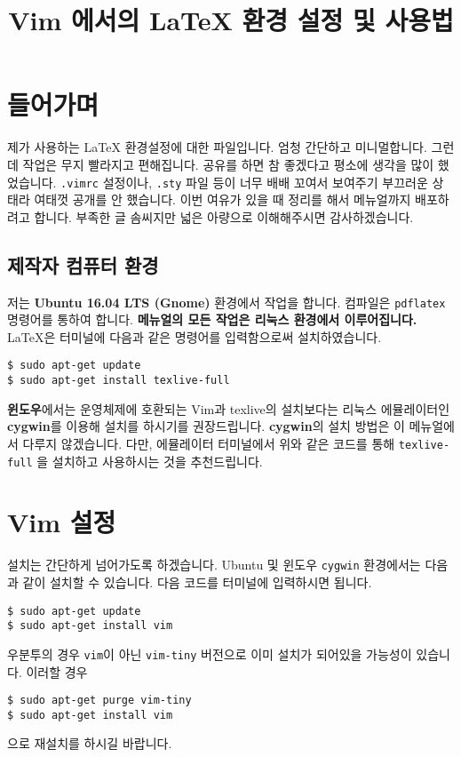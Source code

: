\documentclass[a4paper,10pt]{article}
\title{Vim 에서의 LaTeX 환경 설정 및 사용법}
\author{}
\date{}
\begin{document}
\maketitle

\section{들어가며}
제가 사용하는 LaTeX 환경설정에 대한 파일입니다. 엄청 간단하고 미니멀합니다.
그런데 작업은 무지 빨라지고 편해집니다. 공유를 하면 참 좋겠다고 평소에 생각을 많이
했었습니다. \texttt{.vimrc} 설정이나, \texttt{.sty} 파일 등이 너무 배배 꼬여서 보여주기
부끄러운 상태라 여태껏 공개를 안 했습니다. 이번 여유가 있을 때 정리를 해서 메뉴얼까지
배포하려고 합니다. 부족한 글 솜씨지만 넓은 아량으로 이해해주시면 감사하겠습니다.


\subsection*{제작자 컴퓨터 환경}
저는 \textbf{Ubuntu 16.04 LTS (Gnome)} 환경에서 작업을 합니다. 컴파일은
\texttt{pdflatex} 명령어를 통하여 합니다. \textbf{메뉴얼의 모든 작업은 리눅스 환경에서
이루어집니다.} LaTeX은 터미널에 다음과 같은 명령어를 입력함으로써 설치하였습니다.
\begin{Verbatim}[tabsize=4,xleftmargin=2em]
$ sudo apt-get update
$ sudo apt-get install texlive-full
\end{Verbatim}

\textbf{윈도우}에서는 운영체제에 호환되는 Vim과 texlive의 설치보다는 리눅스 에뮬레이터인
\textbf{cygwin}를 이용해 설치를 하시기를 권장드립니다. \textbf{cygwin}의 설치 방법은
이 메뉴얼에서 다루지 않겠습니다. 다만, 에뮬레이터 터미널에서 위와 같은 코드를 통해
\texttt{texlive-full} 을 설치하고 사용하시는 것을 추천드립니다.



\section{Vim 설정}
설치는 간단하게 넘어가도록 하겠습니다. Ubuntu 및 윈도우 \texttt{cygwin} 환경에서는
다음과 같이 설치할 수 있습니다. 다음 코드를 터미널에 입력하시면 됩니다.
\begin{Verbatim}[tabsize=4,xleftmargin=2em]
$ sudo apt-get update
$ sudo apt-get install vim
\end{Verbatim}

우분투의 경우 \texttt{vim}이 아닌 \texttt{vim-tiny} 버전으로 이미 설치가 되어있을 가능성이
있습니다. 이러할 경우
\begin{Verbatim}[tabsize=4,xleftmargin=2em]
$ sudo apt-get purge vim-tiny
$ sudo apt-get install vim
\end{Verbatim}
으로 재설치를 하시길 바랍니다.
\end{document}
